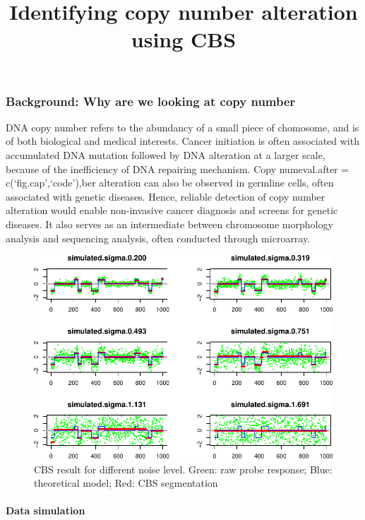 \documentclass[]{article}
\title{Identifying copy number alteration using CBS}
\author{}
\date{}
\let\oldparagraph\paragraph
\renewcommand{\paragraph}[1]{\oldparagraph{#1}\mbox{}}
\begin{document}
\maketitle

\subsubsection{Background: Why are we looking at copy
number}\label{background-why-are-we-looking-at-copy-number}

DNA copy number refers to the abundancy of a small piece of chomosome,
and is of both biological and medical interests. Cancer initiation is
often associated with accumulated DNA mutation followed by DNA
alteration at a larger scale, because of the inefficiency of DNA
repairing mechanism. Copy numeval.after = c(`fig.cap',`code'),ber
alteration can also be observed in germline cells, often associated with
genetic diseases. Hence, reliable detection of copy number alteration
would enable non-invasive cancer diagnosis and screens for genetic
diseases. It also serves as an intermediate between chromosome
morphology analysis and sequencing analysis, often conducted through
microarray.

\begin{figure}
\centering
\includegraphics{copynumber_files/figure-latex/CBS-1.pdf}
\caption{\label{fig:CBS_1} CBS result for different noise level. Green:
raw probe response; Blue: theoretical model; Red: CBS segmentation}
\end{figure}

\paragraph{Data simulation}\label{data-simulation}
\end{document}
